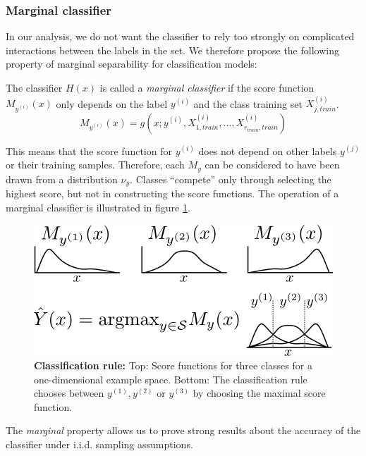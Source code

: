 \documentclass[twoside,11pt]{article}
\begin{document}
\subsubsection{Marginal classifier}

In our analysis, we do not want the classifier to rely too strongly on
complicated interactions between the labels in the set. We therefore
propose the following property of marginal separability for
classification models:

\begin{definition}
The classifier $H(x)$ is called a \emph{marginal classifier} if the
score function $M_{y^{(i)}}(x)$ only depends on the label $y^{(i)}$
and the class training set $X_{j, train}^{(i)}$.
\[M_{y^{(i)}}(x) = g(x; y^{(i)},X_{1, train}^{(i)},...,X_{r_{train}, train}^{(i)})\]
\end{definition}
This means that the score function for $y^{(i)}$ does not depend on
other labels $y^{(j)}$ or their training samples.  Therefore, each
$M_y$ can be considered to have been drawn from a distribution
$\nu_y$.  Classes ``compete'' only through selecting the highest
score, but not in constructing the score functions.  The operation of
a marginal classifier is illustrated in figure
\ref{fig:classification_rule}.


\begin{figure}[h]
\centering
\includegraphics[scale = 0.4]{classification_rule.png}
\caption{\textbf{Classification rule:} Top: Score functions for three classes for a one-dimensional example space. Bottom: The classification rule chooses between $y^{(1)},y^{(2)}$ or $y^{(3)}$ by choosing the maximal score function. 
}
\label{fig:classification_rule}
\end{figure}

The \emph{marginal} property allows us to prove
strong results about the accuracy of the classifier under
i.i.d. sampling assumptions.
\end{document}
